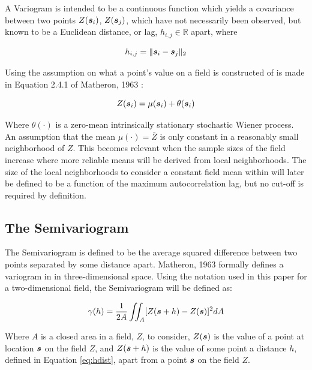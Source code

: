 A Variogram is intended to be a continuous function which yields a covariance between two points $Z({\it{\boldsymbol{s}}}_{i})$, $Z({\it{\boldsymbol{s}}}_{j})$, which have not necessarily been observed, but known to be a Euclidean distance, or lag, $h_{i,j} \in \mathbb{R}$ apart, where

\begin{equation}
h_{i,j} = \| {\it{\boldsymbol{s}}}_i - {\it{\boldsymbol{s}}}_j \|_2
\label{eq:hdist}
\end{equation}

Using the assumption on what a point's value on a field is constructed of is made in Equation 2.4.1 of Matheron, 1963 \cite{matheron:geostat}:

\begin{equation}
    Z({\it{\boldsymbol{s}}}_i)=\mu({\it{\boldsymbol{s}}}_i)+\theta({\it{\boldsymbol{s}}}_i)
    \label{eq:matheron:assum}
\end{equation}

Where $\theta(\cdot)$ is a zero-mean intrinsically stationary stochastic Wiener process. An assumption that the mean $\mu(\cdot) = \bar{Z}$ is only constant in a reasonably small neighborhood of $Z$. This becomes relevant when the sample sizes of the field increase where more reliable means will be derived from local neighborhoods. The size of the local neighborhoods to consider a constant field mean within will later be defined to be a function of the maximum autocorrelation lag, but no cut-off is required by definition.

\subsection{The Semivariogram}
The Semivariogram is defined to be the average squared difference between two points separated by some distance apart. Matheron, 1963 formally defines a variogram in \cite{matheron:geostat} in three-dimensional space. Using the notation used in this paper for a two-dimensional field, the Semivariogram will be defined as:

\begin{equation}
    \gamma(h) = \frac{1}{2A} \iint_A [ Z({\it{\boldsymbol{s}}} + h) - Z({\it{\boldsymbol{s}}}) ]^2 dA
    \label{eq:semivariogramint}
\end{equation}

Where $A$ is a closed area in a field, $Z$, to consider, $Z({\it{\boldsymbol{s}}})$ is the value of a point at location ${\it{\boldsymbol{s}}}$ on the field $Z$, and $Z({\it{\boldsymbol{s}}} + h)$ is the value of some point a distance $h$, defined in Equation \ref{eq:hdist}, apart from a point ${\it{\boldsymbol{s}}}$ on the field $Z$.

